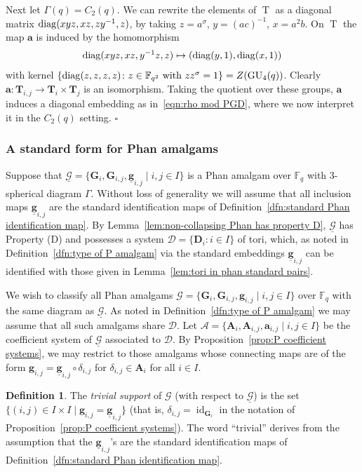 \documentclass[12pt]{amsart}
\theoremstyle{definition}
\newtheorem{definition}[theorem]{Definition}
\newcommand{\epf}{\qed}
\newcommand{\bde}{\begin{definition}}
\newcommand{\ede}{\end{definition}}
\newcommand{\ul}{\underline}
\newcommand{\cD}{{\mathcal D}}
\newcommand{\diag}{\mathop{\rm diag}\nolimits}
\DeclareMathOperator{\id}{id}
\def\cD{{\mathcal D}}
\newcommand{\FF}{{\mathbb F}}
\newcommand{\dfn}{\em}
\newcommand{\after}{\mathbin{ \circ }}
\DeclareMathOperator{\GD}{T}
\DeclareMathOperator{\GU}{GU}
\renewcommand{\qed}{\hfill $\square$}
\newcommand{\amgrpA}{{\mathbf{A}}}
\newcommand{\amgrpD}{{\mathbf{D}}}
\newcommand{\amgrpG}{{\mathbf{G}}}
\newcommand{\amgrpT}{{\mathbf{T}}}
\newcommand{\ama}{{\mathbf a}}
\newcommand{\amg}{{\mathbf g}}
\newcommand{\famg}{\ul{\mathbf g}}
\newcommand{\amA}{{\mathscr{A}}}
\newcommand{\famG}{\ul{\mathscr{G}}}
\newcommand{\amG}{{\mathscr{G}}}
\newcommand{\liediag}{\Gamma}
\begin{document}
Next let $\liediag(q)=C_2(q)$.
We can rewrite the elements of $\GD$ as 
 a diagonal matrix $\diag(xyz, xz, z y^{-1}, z)$, by taking $z=a^{\sigma}$, $y=(ac)^{-1}$, $x=a^2b$.
On $\GD$ the map $\ama$ is induced by the homomorphism 
 \begin{align*}
\diag(xyz,xz,y^{-1}z,z) \mapsto (\diag(y,1),\diag(x,1))
 \end{align*}
with kernel $\{\diag(z,z,z,z)\colon z\in \FF_{q^2} \mbox{ with }zz^\sigma=1\}=Z(\GU_4(q))$. 
Clearly $\ama\colon\amgrpT_{i,j}\to \amgrpT_i\times\amgrpT_j$ is an isomorphism.
Taking the quotient over these groups, $\ama$ induces a diagonal embedding as in~\eqref{eqn:rho mod PGD}, where we now interpret it in the $C_2(q)$ setting.
\epf

\medskip
\subsubsection{A standard form for Phan amalgams}\label{subsec:Phan trivial support}

Suppose that $\famG=\{\amgrpG_i,\amgrpG_{i,j},\famg_{i,j}\mid i,j\in I\}$ is a Phan amalgam over $\FF_q$ with $3$-spherical diagram $\liediag$.
Without loss of generality we will assume that all inclusion maps $\famg_{i,j}$ are the standard identification maps of Definition~\ref{dfn:standard Phan identification map}.
By Lemma~\ref{lem:non-collapsing Phan has property D}, $\famG$ has Property (D) and possesses a system 
 $\cD=\{\amgrpD_i\colon i\in I\}$ of tori, which, as noted in Definition~\ref{dfn:type of P amalgam} via the standard embeddings $\famg_{i,j}$ can be identified with those given in Lemma~\ref{lem:tori in phan standard pairs}.

We wish to classify all  Phan amalgams  $\amG=\{\amgrpG_i,\amgrpG_{i,j},\amg_{i,j}\mid i,j\in I\}$ over $\FF_q$ with the same diagram as $\famG$.
As noted in Definition~\ref{dfn:type of P amalgam} we may assume that all such amalgams share $\cD$.
Let $\amA=\{\amgrpA_i,\amgrpA_{i,j},\ama_{i,j}\mid i,j\in I\}$ be the coefficient system of $\famG$ associated to $\cD$.
By Proposition~\ref{prop:P coefficient systems}, we may restrict to those amalgams whose connecting maps 
 are of the form $\amg_{i,j}=\famg_{i,j}\after \delta_{i,j}$ for $\delta_{i,j}\in \amgrpA_i$ for all $i\in I$.

\bde\label{dfn:Phan trivial support}
The {\dfn trivial support} of $\amG$ (with respect to $\famG$) is the set $\{(i,j)\in I\times I\mid \amg_{i,j}=\famg_{i,j}\}$ (that is, $\delta_{i,j}=\id_{\amgrpG_i}$ in the notation of Proposition~\ref{prop:P coefficient systems}).
The word ``trivial'' derives from the assumption that the $\famg_{i,j}$'s are the standard identification maps of Definition~\ref{dfn:standard Phan identification map}.
\ede
\end{document}
